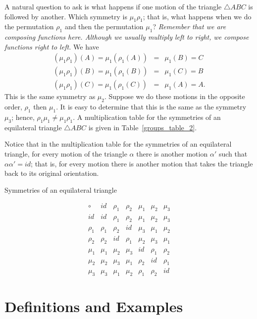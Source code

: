 A natural question to ask is what happens if one motion of the triangle $\bigtriangleup ABC$ is followed by another.  Which symmetry is $\mu_1 \rho_1$; that is, what happens when we do the permutation $\rho_1$ and then the permutation $\mu_1$?  {\em Remember that we are composing functions here.  Although we usually multiply left to right, we compose functions right to left.} We have
\begin{eqnarray*}
(\mu_1 \rho_1)(A) = \mu_1( \rho_1( A ) ) &=& \mu_1( B ) = C \\
(\mu_1 \rho_1)(B) = \mu_1( \rho_1( B ) ) &=& \mu_1( C ) = B \\
(\mu_1 \rho_1)(C) = \mu_1( \rho_1( C ) ) &=& \mu_1( A ) = A.
\end{eqnarray*}
This is the same symmetry as $\mu_2$.  Suppose we do these motions in the opposite order, $\rho_1$ then $\mu_1$.  It is easy to determine that this is the same as the symmetry $\mu_3$; hence, $\rho_1 \mu_1 \neq \mu_1 \rho_1$.  A multiplication table for the symmetries of an equilateral triangle $\bigtriangleup ABC$ is given in Table~\ref{groups_table_2}.

Notice that in the multiplication table for the symmetries of an equilateral triangle, for every motion of the triangle $\alpha$ there is another motion $\alpha'$ such that $\alpha \alpha' = id$;  that is, for every motion there is another  motion that takes the triangle back to its original orientation.  

\begin{table}\label{groups_table_2}
\caption{Symmetries of an equilateral triangle}{\small
$$
\begin{array}{c|cccccc}
\circ  & id     & \rho_1 & \rho_2 & \mu_1 & \mu_2 & \mu_3 \\
\hline
id     & id     & \rho_1 & \rho_2 & \mu_1 & \mu_2 & \mu_3 \\
\rho_1 & \rho_1 & \rho_2 & id     & \mu_3 & \mu_1 & \mu_2 \\
\rho_2 & \rho_2 & id     & \rho_1 & \mu_2 & \mu_3 & \mu_1 \\
\mu_1  & \mu_1  & \mu_2  & \mu_3  & id    & \rho_1& \rho_2\\
\mu_2  & \mu_2  & \mu_3  & \mu_1  & \rho_2& id    & \rho_1\\
\mu_3  & \mu_3  & \mu_1  & \mu_2  & \rho_1& \rho_2& id
\end{array}
$$	   
}
\end{table}
 
 
\section{Definitions and Examples}\label{groups_section_2}
 
